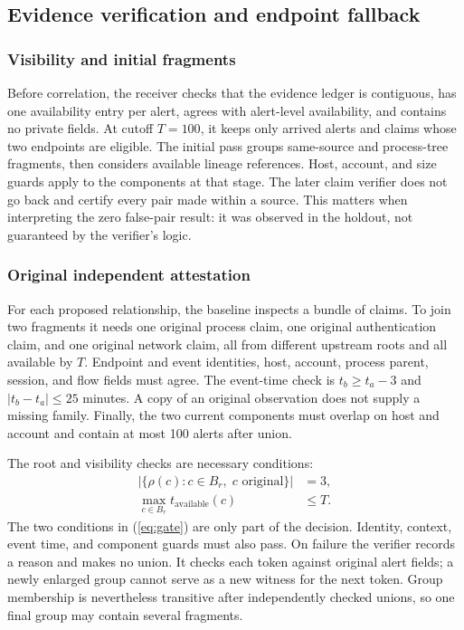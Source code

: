 \documentclass[pdflatex,sn-mathphys-num,iicol]{sn-jnl}
\begin{document}
\subsection{Evidence verification and endpoint fallback}\label{sec:method}
\subsubsection{Visibility and initial fragments}
Before correlation, the receiver checks that the evidence ledger is contiguous, has one availability entry per alert, agrees with alert-level availability, and contains no private fields. At cutoff $T=100$, it keeps only arrived alerts and claims whose two endpoints are eligible. The initial pass groups same-source and process-tree fragments, then considers available lineage references. Host, account, and size guards apply to the components at that stage. The later claim verifier does not go back and certify every pair made within a source. This matters when interpreting the zero false-pair result: it was observed in the holdout, not guaranteed by the verifier's logic.

\subsubsection{Original independent attestation}
For each proposed relationship, the baseline inspects a bundle of claims. To join two fragments it needs one original process claim, one original authentication claim, and one original network claim, all from different upstream roots and all available by $T$. Endpoint and event identities, host, account, process parent, session, and flow fields must agree. The event-time check is $t_b\geq t_a-3$ and $|t_b-t_a|\leq25$ minutes. A copy of an original observation does not supply a missing family. Finally, the two current components must overlap on host and account and contain at most 100 alerts after union.

The root and visibility checks are necessary conditions:
\begin{equation}\label{eq:gate}
\begin{aligned}
\left|\{\rho(c):c\in B_r,\;c\text{ original}\}\right|&=3,\\
\max_{c\in B_r}t_{\mathrm{available}}(c)&\leq T.
\end{aligned}
\end{equation}
The two conditions in (\ref{eq:gate}) are only part of the decision. Identity, context, event time, and component guards must also pass. On failure the verifier records a reason and makes no union. It checks each token against original alert fields; a newly enlarged group cannot serve as a new witness for the next token. Group membership is nevertheless transitive after independently checked unions, so one final group may contain several fragments.
\end{document}
